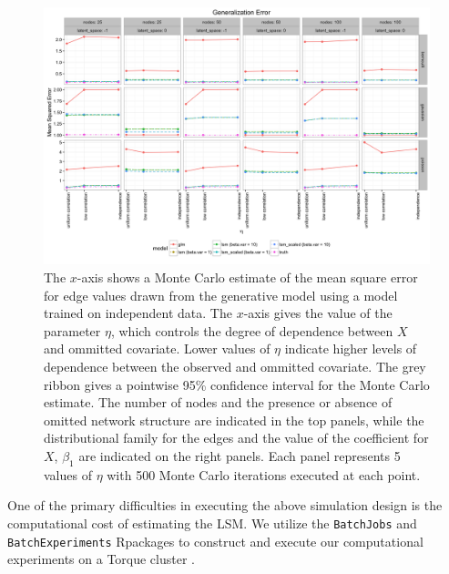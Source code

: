 \documentclass[12pt]{article}
\newcommand{\R}{\textsf{R}\space} %
\begin{document}
\begin{figure}
\includegraphics[width=\textwidth]{generalization.png}
\caption{The $x$-axis shows a Monte Carlo estimate of the mean square error for edge values drawn from the generative model using a model trained on independent data. The $x$-axis gives the value of the parameter $\eta$, which controls the degree of dependence between $X$ and ommitted covariate. Lower values of $\eta$ indicate higher levels of dependence between the observed and ommitted covariate. The grey ribbon gives a pointwise 95\% confidence interval for the Monte Carlo estimate. The number of nodes and the presence or absence of omitted network structure are indicated in the top panels, while the distributional family for the edges and the value of the coefficient for $X$, $\beta_1$ are indicated on the right panels. Each panel represents 5 values of $\eta$ with 500 Monte Carlo iterations executed at each point. \label{fig:generalization}}
\end{figure}

One of the primary difficulties in executing the above simulation design is the computational cost of estimating the LSM. We utilize the \texttt{BatchJobs} and \texttt{BatchExperiments} \R packages to construct and execute our computational experiments on a Torque cluster \cite{bischl2015batchjobs}.

\newpage



\end{document}
